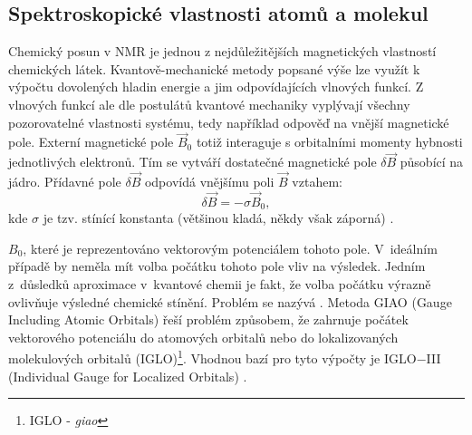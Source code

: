 \documentclass[
  digital, %
  table,   %
  lof,     %
  lot,     %
  oneside,
]{fithesis3}
\begin{document}
 \subsection{Spektroskopické vlastnosti atomů a molekul}
 Chemický posun v NMR je jednou z nejdůležitějších magnetických vlastností chemických látek. Kvantově-mechanické metody popsané výše lze využít k výpočtu dovolených hladin energie a jim odpovídajících vlnových funkcí. Z vlnových funkcí ale dle postulátů kvantové mechaniky vyplývají všechny pozorovatelné vlastnosti systému, tedy například odpověď na vnější magnetické pole. Externí magnetické pole $\vec{B}_0$ totiž interaguje s orbitalními momenty hybnosti jednotlivých elektronů. Tím se vytváří dostatečné magnetické pole $\delta \vec{B}$ působící na jádro. Přídavné pole $\delta \vec{B}$ odpovídá vnějšímu poli $\vec{B}$ vztahem:
\begin{equation}
  \delta \vec{B} = - \sigma \vec{B}_0,
\end{equation}
kde $\sigma$ je tzv. stínící konstanta (většinou kladá, někdy však záporná) \cite{atkins2010atkins}.

 $B_0$, které je reprezentováno vektorovým potenciálem tohoto pole. V~ideálním případě by neměla mít volba počátku tohoto pole vliv na výsledek. Jedním z~důsledků aproximace v~kvantové chemii je fakt, že volba počátku výrazně ovlivňuje výsledné chemické stínění. Problém se nazývá . Metoda GIAO \cite{giao} (Gauge  Including Atomic Orbitals) řeší problém způsobem, že zahrnuje počátek vektorového potenciálu do atomových orbitalů nebo do lokalizovaných molekulových orbitalů (IGLO)\footnote{IGLO - \textit{giao}}. Vhodnou bazí pro tyto výpočty je IGLO$-$III \cite{Standara2006thesis} (Individual Gauge for Localized Orbitals) \cite{g09}.
\end{document}
